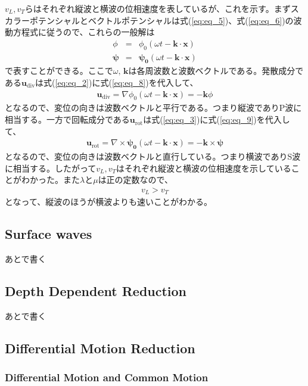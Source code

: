 $v_{L},v_{T}$らはそれぞれ縦波と横波の位相速度を表しているが、これを示す。まずスカラーポテンシャルとベクトルポテンシャルは式(\ref{eq:eq_5})、式(\ref{eq:eq_6})の波動方程式に従うので、これらの一般解は
\begin{eqnarray}
  \phi &=& \phi_{0}(\omega{t}-\bm{k}\cdot{\bm{x}}) \label{eq:eq_8}\\
  \bm{\psi} &=& \bm{\psi_{0}}(\omega{t}-\bm{k}\cdot{\bm{x}}) \label{eq:eq_9}
\end{eqnarray}
で表すことができる。ここで$\omega,\,\bm{k}$は各周波数と波数ベクトルである。発散成分である$\bm{u}_{\mathrm{div}}$は式(\ref{eq:eq_2})に式(\ref{eq:eq_8})を代入して、
\begin{eqnarray}
  \bm{u}_{\mathrm{div}} = \nabla{\phi_{0}(\omega{t}-\bm{k}\cdot{\bm{x}})} =-\bm{k}{\phi}
\end{eqnarray}
となるので、変位の向きは波数ベクトルと平行である。つまり縦波でありP波に相当する。一方で回転成分である$\bm{u}_{\mathrm{rot}}$は式(\ref{eq:eq_3})に式(\ref{eq:eq_9})を代入して、
\begin{eqnarray}
  \bm{u}_{\mathrm{rot}} = \nabla\times{\bm{\psi_{0}}(\omega{t}-\bm{k}\cdot{\bm{x}})} =-\bm{k}\times{\bm{\psi}}
\end{eqnarray}
となるので、変位の向きは波数ベクトルと直行している。つまり横波でありS波に相当する。したがって$v_{L},v_{T}$はそれぞれ縦波と横波の位相速度を示していることがわかった。また$\lambda$と$\mu$は正の定数なので、
\begin{eqnarray}
  v_{L} > v_{T}
\end{eqnarray}
となって、縦波のほうが横波よりも速いことがわかる。

\subsection{Surface waves}
あとで書く

\subsection{Depth Dependent Reduction}
あとで書く

\subsection{Differential Motion Reduction}
\subsubsection{Differential Motion and Common Motion}

